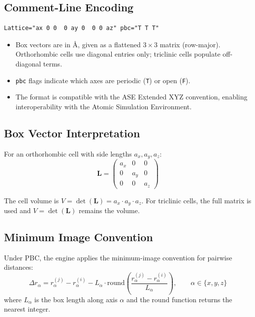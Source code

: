 \documentclass[12pt, a4paper, oneside]{article}
\begin{document}
\subsection{Comment-Line Encoding}

\begin{lstlisting}[language={},frame=single]
Lattice="ax 0 0  0 ay 0  0 0 az" pbc="T T T"
\end{lstlisting}

\begin{itemize}
  \item Box vectors are in \AA, given as a flattened $3\times 3$
        matrix (row-major).  Orthorhombic cells use diagonal entries
        only; triclinic cells populate off-diagonal terms.
  \item \texttt{pbc} flags indicate which axes are periodic
        (\texttt{T}) or open (\texttt{F}).
  \item The format is compatible with the ASE Extended XYZ convention,
        enabling interoperability with the Atomic Simulation Environment.
\end{itemize}

\subsection{Box Vector Interpretation}

For an orthorhombic cell with side lengths $a_x, a_y, a_z$:
\begin{equation}
  \mathbf{L} =
  \begin{pmatrix}
    a_x & 0   & 0   \\
    0   & a_y & 0   \\
    0   & 0   & a_z
  \end{pmatrix}
  \label{eq:lattice}
\end{equation}

The cell volume is $V = \det(\mathbf{L}) = a_x \cdot a_y \cdot a_z$.
For triclinic cells, the full matrix is used and $V = \det(\mathbf{L})$
remains the volume.

\subsection{Minimum Image Convention}

Under PBC, the engine applies the minimum-image convention for
pairwise distances:
\begin{equation}
  \Delta r_\alpha = r_\alpha^{(j)} - r_\alpha^{(i)}
    - L_\alpha \cdot \mathrm{round}\!\left(
      \frac{r_\alpha^{(j)} - r_\alpha^{(i)}}{L_\alpha}
    \right),
  \qquad \alpha \in \{x, y, z\}
  \label{eq:mic}
\end{equation}
where $L_\alpha$ is the box length along axis $\alpha$ and the
$\mathrm{round}$ function returns the nearest integer.
\end{document}
